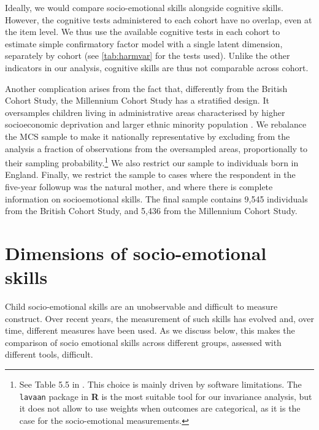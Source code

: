 Ideally, we would compare socio-emotional skills alongside cognitive skills. However, the cognitive tests administered to each cohort have no overlap, even at the item level. We thus use the available cognitive tests in each cohort to estimate simple confirmatory factor model with a single latent dimension, separately by cohort (see \autoref{tab:harmvar} for the tests used). Unlike the other indicators in our analysis, cognitive skills are thus not comparable across cohort. 

Another complication arises from the fact that, differently from the British Cohort Study, the Millennium Cohort Study has a stratified design. It oversamples children living in administrative areas characterised by higher socioeconomic deprivation and larger ethnic minority population \citep{Plewis2007}. We rebalance the MCS sample to make it nationally representative by excluding from the analysis a fraction of observations from the oversampled areas, proportionally to their sampling probability.\footnote{See Table 5.5 in \citet{Plewis2007}. This choice is mainly driven by software limitations. The \texttt{lavaan} package in \textbf{\textsf{R}} \citep{Rosseel2012} is the most suitable tool for our invariance analysis, but it does not allow to use weights when outcomes are categorical, as it is the case for the socio-emotional measurements.}
We also restrict our sample to individuals born in England. Finally, we restrict the sample to cases where the respondent in the five-year followup was the natural mother, and where there is complete information on socioemotional skills. The final sample contains 9,545 individuals from the British Cohort Study, and 5,436 from the Millennium Cohort Study.

\section{Dimensions of  socio-emotional skills \label{sec:methods}}

Child socio-emotional skills are an unobservable and difficult to measure construct. Over recent years, the measurement of such skills has evolved and, over time, different measures have been used.  As we discuss below, this makes the comparison  of socio emotional skills across different groups, assessed with different tools, difficult.

